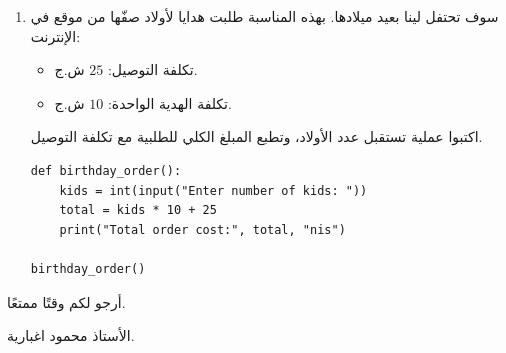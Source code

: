 \documentclass[14pt]{extarticle}
\begin{document}
\begin{enumerate}[resume, label=\textbf{تمرين \arabic*:}, wide=0pt, itemsep=2.2em]
\begin{boxCode}
\begin{english}
\begin{verbatim}
ex3()
\end{verbatim}
\end{english}
\end{boxCode}

\ifwithsols
\begin{boxSolution}
\begin{english}
\begin{verbatim}
def ex3():
    super_man = 6
    clown = 10
    fighter = 15
    total_cost = super_man * 10 + clown * 5 + fighter * 12
    print("total_cost= ", total_cost)

ex3()
\end{verbatim}
\end{english}
\end{boxSolution}
\fi
\filbreak

\item سوف تحتفل لينا بعيد ميلادها. بهذه المناسبة طلبت هدايا لأولاد صفّها من موقع في الإنترنت:
\begin{itemize}
\item تكلفة التوصيل: $25$ ش.ج.
\item تكلفة الهدية الواحدة: $10$ ش.ج.
\end{itemize}
اكتبوا عملية تستقبل عدد الأولاد، وتطبع المبلغ الكلي للطلبية مع تكلفة التوصيل.

\ifwithsols
\begin{boxSolution}
\begin{english}
\begin{verbatim}
def birthday_order():
    kids = int(input("Enter number of kids: "))
    total = kids * 10 + 25
    print("Total order cost:", total, "nis")

birthday_order()
\end{verbatim}
\end{english}
\end{boxSolution}
\fi
\filbreak

\end{enumerate}

\vspace{1cm}
\begin{flushleft}
أرجو لكم وقتًا ممتعًا.

الأستاذ محمود اغبارية.
\end{flushleft}
\end{document}

